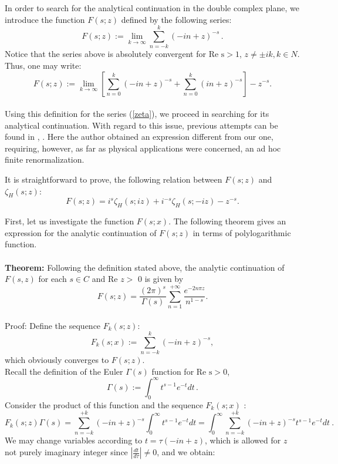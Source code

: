 \documentclass [11pt]{article}
\begin{document}
In order to search for the analytical continuation in the double complex plane, we introduce the function $F(s;z)$
defined by the following series:
\begin{equation}
\label{zeta}
F(s;z):=\lim_{k\rightarrow\infty}\sum_{n=-k}^{k}(-in+z)^{-s}\, .
\end{equation}
Notice that the  series above is absolutely convergent  for  $\mbox{Re s}> 1$,
$z \neq \pm ik, k \in N$. 
Thus, one may write:
\begin{equation}
\label{decomp}
F(s;z):=\lim_{k\rightarrow\infty}\left[ \sum_{n=0}^{k}(-in+z)^{-s}+\sum_{n=0}^{k}(in+z)^{-s}\right]-z^{-s}.
\end{equation}
\\
Using this definition for the series (\ref{zeta}), we proceed in searching for its analytical continuation.
With regard to this issue, previous attempts  can be found in \cite{Tomszeta}, \cite{Toms:1995rr}. Here the author obtained an expression different from our one, requiring, however, as far as   
physical  applications were concerned, an ad hoc finite renormalization.

It is straightforward to prove, the following relation between $F(s;z)$  and 
$\zeta_H(s;z)$:
\begin{equation}
\label{relation}
F(s;z)=i^{s}\zeta _{H}(s;iz)+i^{-s}\zeta _{H}(s;-iz)-z^{-s}.
\end{equation}

First, let us investigate the  function $F(s;x)$.
The following theorem gives an expression for the analytic continuation of $F(s;z)$ in terms of
polylogarithmic function.
\\
\\
{\bf Theorem:}
Following the definition stated above, the analytic continuation of $F(s,z)$ for each $s\in C$ and
$\mbox{Re}$ $z>$ 0 is given by\\
\begin{equation}
\label{master}
F(s;z)=\frac{(2\pi )^{s}}{\Gamma (s)} \sum _{n=1}^{+\infty }\frac{e^{-2n\pi z}}{n^{1-s}}.
\end{equation}\\
Proof:
Define the sequence $F_k (s;z):$
\begin{equation}
F_k (s;x):=\sum_{n=-k}^{k}(-in+z)^{-s}, 
\end{equation}
which obviously converges to $F(s;z)$.\\
Recall the definition of the Euler $\Gamma(s)$ function for $\mbox{Re s}>0$,
 \begin{equation}\nonumber
\Gamma (s):=\int _{0}^{\infty }t^{s-1}e^{-t}dt\, .
\end{equation}
Consider the product of this function and the sequence $F_k (s;x)$ :
\begin{equation}\nonumber
F_k (s;z)\Gamma(s) = \sum_{n=-k}^{+k }(-in+z)^{-s}\int _{0}^{\infty}t^{s-1}e^{-t}dt=
\int _{0}^{\infty}\sum_{n=-k}^{+k }(-in+z)^{-s}t^{s-1}e^{-t}dt\: .
\end{equation}
We may change variables according to $t=\tau(-in+z)$, which is allowed for $z$ not purely imaginary integer since 
$|\frac{dt}{d\tau}|\neq0$, and we obtain:
\end{document}
